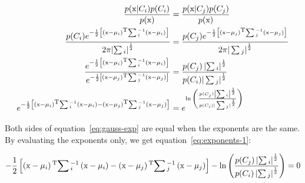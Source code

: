 \documentclass[paper=a4, fontsize=11pt]{scrartcl} %
\numberwithin{equation}{section} %
\numberwithin{figure}{section} %
\numberwithin{table}{section} %
\begin{document}
\begin{equation}
\begin{split}
        \frac{p(\text{x}|C_i)p(C_i)}{p(\text{x})} &= \frac{p(\text{x}|C_j)p(C_j)}{p(\text{x})}\\
        \frac{p(C_i)e^{-\frac{1}{2}\left[\left(\text{x} - \mu_{i}\right)\textsuperscript{T}{\sum\text{$^{-1}_{i}$}}\left(\text{x} - \mu_{i}\right)\right]}}{2\pi{\left|\sum\text{$_{i}$}\right|}^{\frac{1}{2}}} &= \frac{p(C_j)e^{-\frac{1}{2}\left[\left(\text{x} - \mu_{j}\right)\textsuperscript{T}{\sum\text{$^{-1}_{j}$}}\left(\text{x} - \mu_{j}\right)\right]}}{2\pi{|\sum\text{$_{j}$}|}^{\frac{1}{2}}}\\
        \frac{e^{-\frac{1}{2}\left[\left(\text{x} - \mu_{i}\right)\textsuperscript{T}{\sum\text{$^{-1}_{i}$}}\left(\text{x} - \mu_{i}\right)\right]}}{e^{-\frac{1}{2}\left[\left(\text{x} - \mu_{j}\right)\textsuperscript{T}{\sum\text{$^{-1}_{j}$}}\left(\text{x} - \mu_{j}\right)\right]}} &= \frac{{p(C_j)\left|\sum\text{$_{i}$}\right|}^{\frac{1}{2}}}{{p(C_i)|\sum\text{$_{j}$}|}^{\frac{1}{2}}}\\
        e^{-\frac{1}{2}\left[\left(\text{x} - \mu_{i}\right)\textsuperscript{T}{\sum\text{$^{-1}_{i}$}}\left(\text{x} - \mu_{i}\right)
        - \left(\text{x} - \mu_{j}\right)\textsuperscript{T}{\sum\text{$^{-1}_{j}$}}\left(\text{x} - \mu_{j}\right)\right]} &= e^{\ln{\left(\frac{{p(C_j)\left|\sum\text{$_{i}$}\right|}^{\frac{1}{2}}}{{p(C_i)|\sum\text{$_{j}$}|}^{\frac{1}{2}}}\right)}}
    \label{eq:gauss-exp}
\end{split}
\end{equation}

Both sides of equation~\ref{eq:gauss-exp} are equal when the exponents are the 
same. By evaluating the exponents only, we get equation~\ref{eq:exponents-1}:

\begin{equation}
        -\frac{1}{2}\left[\left(\text{x} - \mu_{i}\right)\textsuperscript{T}{\sum\text{$^{-1}_{i}$}}\left(\text{x} - \mu_{i}\right)
        - \left(\text{x} - \mu_{j}\right)\textsuperscript{T}{\sum\text{$^{-1}_{j}$}}\left(\text{x} - \mu_{j}\right)\right] - \ln{\left(\frac{{p(C_j)\left|\sum\text{$_{i}$}\right|}^{\frac{1}{2}}}{{p(C_i)\left|\sum\text{$_{j}$}\right|}^{\frac{1}{2}}}\right)} = 0
    \label{eq:exponents-1}
\end{equation}
\end{document}
